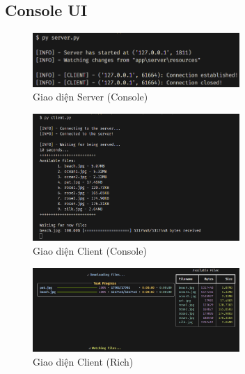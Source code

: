 \documentclass[a4paper,12pt]{report}
\begin{document}
\subsection{Console UI}
\begin{figure}[ht]
  \centering
  \includegraphics[width=0.7\textwidth]{Screenshots/server-console.png}
  \caption{Giao diện Server (Console)}\label{fig:server-console}
\end{figure}
\begin{figure}[ht]
  \centering
  \includegraphics[width=0.7\textwidth]{Screenshots/client-console.png}
  \caption{Giao diện Client (Console)}\label{fig:client-console}
\end{figure}
\begin{figure}[ht]
  \centering
  \includegraphics[width=0.7\textwidth]{Screenshots/client-rich.png}
  \caption{Giao diện Client (Rich)}\label{fig:client-rich}
\end{figure}

\pagebreak
\end{document}
